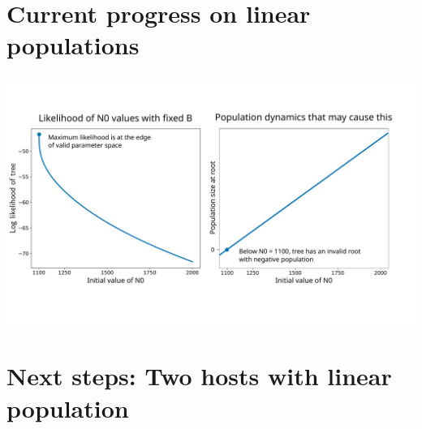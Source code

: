 \documentclass[aspectratio=169]{beamer}
\begin{document}
\section{Current progress on linear populations}

\begin{frame} \frametitle{\insertsection}

    \centering\includegraphics[width=\textwidth]{images/linear-progress}

\end{frame}

\section{Next steps: Two hosts with linear population}
\end{document}
